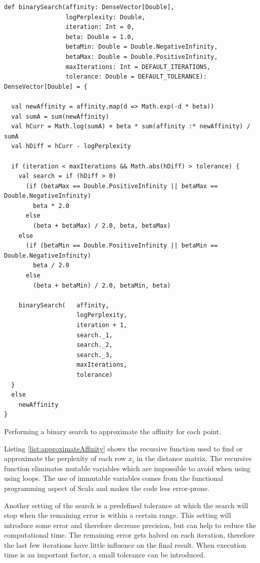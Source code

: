 \begin{listing}[ht!]
\begin{verbatim}
def binarySearch(affinity: DenseVector[Double],
                 logPerplexity: Double,
                 iteration: Int = 0,
                 beta: Double = 1.0,
                 betaMin: Double = Double.NegativeInfinity,
                 betaMax: Double = Double.PositiveInfinity,
                 maxIterations: Int = DEFAULT_ITERATIONS,
                 tolerance: Double = DEFAULT_TOLERANCE): DenseVector[Double] = {

  val newAffinity = affinity.map(d => Math.exp(-d * beta))
  val sumA = sum(newAffinity)
  val hCurr = Math.log(sumA) + beta * sum(affinity :* newAffinity) / sumA
  val hDiff = hCurr - logPerplexity

  if (iteration < maxIterations && Math.abs(hDiff) > tolerance) {
    val search = if (hDiff > 0)
      (if (betaMax == Double.PositiveInfinity || betaMax == Double.NegativeInfinity)
        beta * 2.0
      else
        (beta + betaMax) / 2.0, beta, betaMax)
    else
      (if (betaMin == Double.PositiveInfinity || betaMin == Double.NegativeInfinity)
        beta / 2.0
      else
        (beta + betaMin) / 2.0, betaMin, beta)

    binarySearch(   affinity,
                    logPerplexity, 
                    iteration + 1, 
                    search._1, 
                    search._2, 
                    search._3, 
                    maxIterations, 
                    tolerance)
  }
  else
    newAffinity
}
\end{verbatim}
\caption{Performing a binary search to approximate the affinity for each point.}
\label{list:approximateAffinity}
\end{listing}

Listing \ref{list:approximateAffinity} shows the recursive function used to find or approximate the perplexity of each row $x_{i}$ in the distance matrix. The recursive function eliminates mutable variables which are impossible to avoid when using using loops. The use of immutable variables comes from the functional programming aspect of Scala and makes the code less error-prone.

Another setting of the search is a predefined tolerance at which the search will stop when the remaining error is within a certain range. This setting will introduce some error and therefore decrease precision, but can help to reduce the computational time. The remaining error gets halved on each iteration, therefore the last few iterations have little influence on the final result. When execution time is an important factor, a small tolerance can be introduced.

